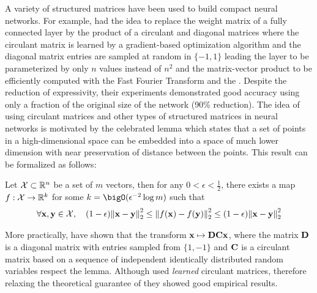 

\drawstar

A variety of structured matrices have been used to build compact neural networks.
For example, \citet{cheng2015exploration} had the idea to replace the weight matrix of a fully connected layer by the product of a circulant and diagonal matrices where the circulant matrix is learned by a gradient-based optimization algorithm and the diagonal matrix entries are sampled at random in $\{-1, 1\}$ leading the layer to be parameterized by only $n$ values instead of $n^2$ and the matrix-vector product to be efficiently computed with the Fast Fourier Transform and the .
Despite the reduction of expressivity, their experiments demonstrated good accuracy using only a fraction of the original size of the network (90\% reduction).
The idea of using circulant matrices and other types of structured matrices in neural networks is motivated by the celebrated \citeauthor{johnson1984extensions} lemma which states that a set of points in a high-dimensional space can be embedded into a space of much lower dimension with near preservation of distance between the points.
This result can be formalized as follows:
\begin{lemma}
  Let $\mathcal{X} \subset \mathbb{R}^n$ be a set of $m$ vectors, then for any $0 < \epsilon < \frac{1}{2}$, there exists a map $f: \mathcal{X} \rightarrow \mathbb{R}^k$ for some $k = \bigO(\epsilon^{-2} \log m)$ such that
  \begin{equation}
    \forall \mathbf{x}, \mathbf{y} \in \mathcal{X}, \quad (1 - \epsilon) \norm{\mathbf{x} - \mathbf{y}}_2^2 \leq \norm{f(\mathbf{x}) - f(\mathbf{y})}_2^2 \leq (1 - \epsilon) \norm{\mathbf{x} - \mathbf{y}}_2^2 
  \end{equation}
  \removespace
\end{lemma}
\noindent
More practically, \citet{hinrichs2011johnson} have shown that the \DC transform $\mathbf{x} \mapsto \mathbf{D} \mathbf{C} \mathbf{x}$, where the matrix $\mathbf{D}$ is a diagonal matrix with entries sampled from $\{1, -1\}$ and $\mathbf{C}$ is a circulant matrix based on a sequence of independent identically distributed random variables respect the \citeauthor{johnson1984extensions} lemma.
Although \citet{cheng2015exploration} used \emph{learned} circulant matrices, therefore relaxing the theoretical guarantee of \citet{hinrichs2011johnson} they showed good empirical results. 

